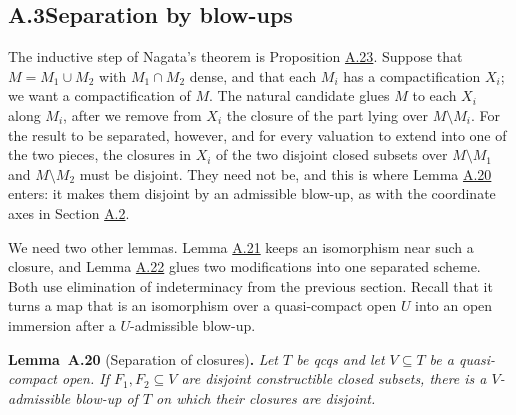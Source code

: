 \documentclass[11pt]{article}
\newenvironment{bpstatement}[2]{\par\addvspace{0.6\baselineskip}\noindent\textbf{#1}#2\textbf{.}\enspace\ignorespaces}
  {\par\addvspace{0.4\baselineskip}}
\newenvironment{bpstatementit}[2]{\begin{bpstatement}{#1}{#2}\itshape\ignorespaces}{\end{bpstatement}}
\begin{document}
\subsection*{\texorpdfstring{A.3\quad Separation by blow-ups}{A.3 Separation by blow-ups}}
\label{bp53}%
\label{bp54}%
The inductive step of Nagata's theorem is Proposition \hyperref[bp63]{A.23}. Suppose that \(M=M_1\cup M_2\) with \(M_1\cap M_2\) dense, and that each \(M_i\) has a compactification \(X_i\); we want a compactification of \(M\). The natural candidate glues \(M\) to each \(X_i\) along \(M_i\), after we remove from \(X_i\) the closure of the part lying over \(M\setminus M_i\). For the result to be separated, however, and for every valuation to extend into one of the two pieces, the closures in \(X_i\) of the two disjoint closed subsets over \(M\setminus M_1\) and \(M\setminus M_2\) must be disjoint. They need not be, and this is where Lemma \hyperref[bp55]{A.20} enters: it makes them disjoint by an admissible blow-up, as with the coordinate axes in Section \hyperref[bp25]{A.2}.

We need two other lemmas. Lemma \hyperref[bp57]{A.21} keeps an isomorphism near such a closure, and Lemma \hyperref[bp60]{A.22} glues two modifications into one separated scheme. Both use elimination of indeterminacy from the previous section. Recall that it turns a map that is an isomorphism over a quasi-compact open \(U\) into an open immersion after a \(U\)-admissible blow-up.

\label{bp55}%
\begin{bpstatementit}{Lemma~A.20}{ (Separation of closures)}
Let \(T\) be qcqs and let \(V\subseteq T\) be a quasi-compact open. If \(F_1,F_2\subseteq V\) are disjoint constructible closed subsets, there is a \(V\)-admissible blow-up of \(T\) on which their closures are disjoint.
\end{bpstatementit}
\end{document}
